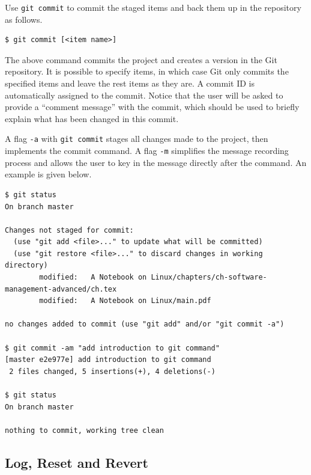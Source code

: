 Use \verb|git commit| to commit the staged items and back them up in the repository as follows.
\begin{lstlisting}
$ git commit [<item name>]
\end{lstlisting}
The above command commits the project and creates a version in the Git repository. It is possible to specify items, in which case Git only commits the specified items and leave the rest items as they are. A commit ID is automatically assigned to the commit. Notice that the user will be asked to provide a ``comment message'' with the commit, which should be used to briefly explain what has been changed in this commit.

A flag \verb|-a| with \verb|git commit| stages all changes made to the project, then implements the commit command. A flag \verb|-m| simplifies the message recording process and allows the user to key in the message directly after the command. An example is given below.
\begin{lstlisting}
$ git status
On branch master

Changes not staged for commit:
  (use "git add <file>..." to update what will be committed)
  (use "git restore <file>..." to discard changes in working directory)
        modified:   A Notebook on Linux/chapters/ch-software-management-advanced/ch.tex
        modified:   A Notebook on Linux/main.pdf

no changes added to commit (use "git add" and/or "git commit -a")

$ git commit -am "add introduction to git command"
[master e2e977e] add introduction to git command
 2 files changed, 5 insertions(+), 4 deletions(-)

$ git status
On branch master

nothing to commit, working tree clean
\end{lstlisting}

\subsection{Log, Reset and Revert}

